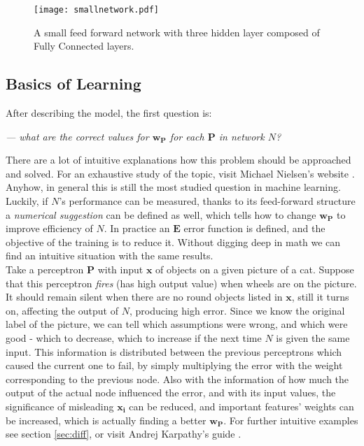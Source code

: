 \begin{figure}
	\centering
	\texttt{[image: smallnetwork.pdf]}
	\caption{A small feed forward network with three hidden layer composed of Fully Connected layers.
	}
	\label{fig:ff}
\end{figure}

\subsection{Basics of Learning}
After describing the model, the first question is:
\begin{flushright}
    \emph{--- what are the correct values for $\mathbf{w_P}$ for each $   
    \mathbf{P}$ in network $N$?} \\ 
\end{flushright}
There are a lot of intuitive explanations how this problem should be approached and solved. 
For an exhaustive study of the topic, visit Michael Nielsen's website \cite{nnsdl}. 
Anyhow, in general this is still the most studied question in machine learning. 
Luckily, if $N$'s performance can be measured, thanks to its feed-forward structure a \emph{numerical suggestion} can be defined as well, which tells how to change $\mathbf{w_P}$ to improve efficiency of $N$. In practice an $\mathbf{E}$ error function is defined, and the objective of the training is to reduce it. Without digging deep in math we can find an intuitive situation with the same results.\\

Take a perceptron $\mathbf{P}$ with input $\mathbf{x}$ of objects on a given picture of a cat. Suppose that this perceptron \emph{fires} (has high output value) when wheels are on the picture. It should remain silent when there are no round objects listed in 
$\mathbf{x}$, still it turns on, affecting the output of $N$, producing high error.
Since we know the original label of the picture, we can tell which assumptions were wrong, and which were good - which to decrease, which to increase if the next time $N$ is given the same input. 
This information is distributed between the previous perceptrons which caused the current one to fail, by simply multiplying the error with the weight corresponding to the previous node. 
Also with the information of how much the output of the actual node influenced the error, and with its input values, the significance of misleading $\mathbf{x_i}$ can be reduced, and important features' weights can be increased, which is actually finding a better $\mathbf{w_P}$.
For further intuitive examples see section \ref{sec:diff}, or visit Andrej Karpathy's guide \cite{karpathyblog}.

